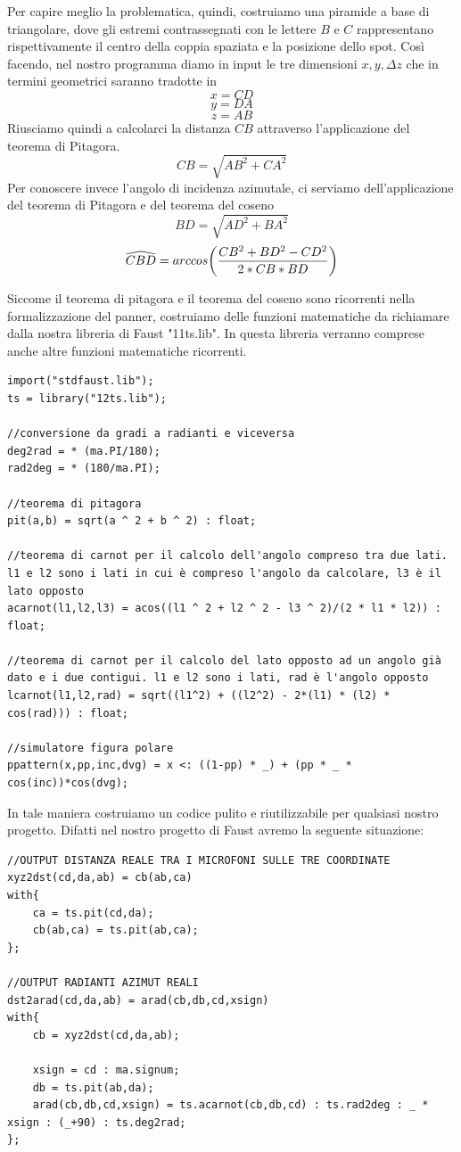 \documentclass{article}
\begin{document}
    Per capire meglio la problematica, quindi, costruiamo una piramide a base di triangolare, dove gli estremi contrassegnati con le lettere $B$ e $C$ rappresentano rispettivamente il centro della coppia spaziata e la posizione dello spot. Così facendo, nel nostro programma diamo in input le tre dimensioni $x, y, \Delta z$ che in termini geometrici saranno tradotte in
    $$x = CD$$
    $$y = DA$$
    $$z = AB$$
    Riusciamo quindi a calcolarci la distanza $CB$ attraverso l'applicazione del teorema di Pitagora.
    $$CB = \sqrt{AB^2 + CA ^ 2}$$
    Per conoscere invece l'angolo di incidenza azimutale, ci serviamo dell'applicazione del teorema di Pitagora e del teorema del coseno
    $$BD = \sqrt{AD^2 + BA ^ 2}$$
    $$\widehat{CBD} = arccos \biggl( {CB ^ 2 + BD ^ 2 - CD ^ 2\over 2 * CB * BD} \biggr)$$

    Siccome il teorema di pitagora e il teorema del coseno sono ricorrenti nella formalizzazione del panner, costruiamo delle funzioni matematiche da richiamare dalla nostra libreria di Faust "11ts.lib". In questa libreria verranno comprese anche altre funzioni matematiche ricorrenti.
    
    \begin{lstlisting}
import("stdfaust.lib");
ts = library("12ts.lib");

//conversione da gradi a radianti e viceversa
deg2rad = * (ma.PI/180);
rad2deg = * (180/ma.PI);

//teorema di pitagora
pit(a,b) = sqrt(a ^ 2 + b ^ 2) : float;

//teorema di carnot per il calcolo dell'angolo compreso tra due lati. l1 e l2 sono i lati in cui è compreso l'angolo da calcolare, l3 è il lato opposto
acarnot(l1,l2,l3) = acos((l1 ^ 2 + l2 ^ 2 - l3 ^ 2)/(2 * l1 * l2)) : float;

//teorema di carnot per il calcolo del lato opposto ad un angolo già dato e i due contigui. l1 e l2 sono i lati, rad è l'angolo opposto
lcarnot(l1,l2,rad) = sqrt((l1^2) + ((l2^2) - 2*(l1) * (l2) * cos(rad))) : float;

//simulatore figura polare
ppattern(x,pp,inc,dvg) = x <: ((1-pp) * _) + (pp * _ * cos(inc))*cos(dvg);
    \end{lstlisting}
    
    
    In tale maniera costruiamo un codice pulito e riutilizzabile per qualsiasi nostro progetto.
    Difatti nel nostro progetto di Faust avremo la seguente situazione:
    
    \begin{lstlisting}
//OUTPUT DISTANZA REALE TRA I MICROFONI SULLE TRE COORDINATE
xyz2dst(cd,da,ab) = cb(ab,ca)
with{
    ca = ts.pit(cd,da);
    cb(ab,ca) = ts.pit(ab,ca);
};

//OUTPUT RADIANTI AZIMUT REALI
dst2arad(cd,da,ab) = arad(cb,db,cd,xsign)
with{
    cb = xyz2dst(cd,da,ab);

    xsign = cd : ma.signum;
    db = ts.pit(ab,da);
    arad(cb,db,cd,xsign) = ts.acarnot(cb,db,cd) : ts.rad2deg : _ * xsign : (_+90) : ts.deg2rad;
};
    \end{lstlisting}
\end{document}
